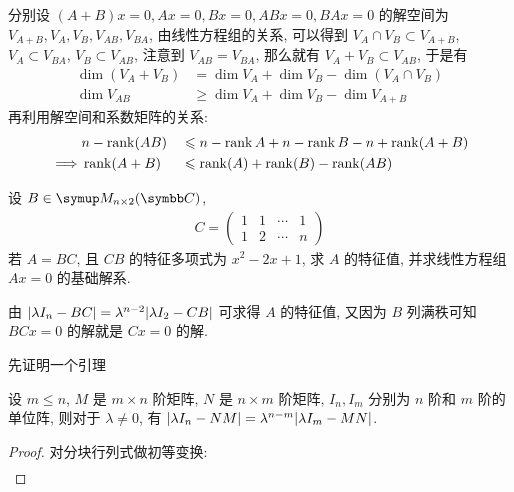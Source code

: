 \begin{exercise}[series=exer]
\begin{hint}
    \end{hint}
    \begin{answer}
        分别设 $ (A + B)x = 0, Ax = 0, Bx = 0, ABx = 0, BAx = 0 $ 的解空间为 $ V_{A+B}, V_{A}, V_{B}, V_{AB}, V_{BA} $, 由线性方程组的关系, 可以得到 $ V_{A} \cap V_{B} \subset V_{A + B} $, $ V_{A} \subset V_{BA}  $, $ V_{B} \subset V_{AB} $, 注意到 $ V_{AB} = V_{BA} $, 那么就有 $ V_{A} + V_{B} \subset V_{AB} $, 于是有
        \begin{align*}
            \dim(V_{A} + V_{B}) & = \dim V_{A} + \dim V_{B} - \dim(V_{A} \cap V_{B})\\
            \dim V_{AB} & \ge  \dim V_{A} + \dim V_{B} - \dim V_{A + B}
        \end{align*}
        再利用解空间和系数矩阵的关系:
        \begin{alignat*}{2}
            & n - \rank (AB) && \leqslant  n - \rank A + n - \rank B - n + \rank (A + B) \\
            \implies & \rank(A + B) && \leqslant \rank(A) + \rank(B) - \rank(AB)
        \end{alignat*}
    \end{answer}
    \item 设 $ B \in \MM[\C][n \times 2] $, 
    \begin{align*}
        C = \begin{pmatrix}
            1 & 1 & \cdots & 1\\
            1 & 2 & \cdots & n
        \end{pmatrix}
    \end{align*}
    若 $ A = BC $, 且 $ CB $ 的特征多项式为 $ x^{2} - 2x + 1 $, 求 $ A $ 的特征值, 并求线性方程组 $ Ax = 0 $ 的基础解系. 
    \begin{hint}
        由 $ \abs{\lambda I_{n} - BC} = \lambda^{n - 2}\abs{\lambda I_{2} - CB} $ 可求得 $ A $ 的特征值, 又因为 $ B $ 列满秩可知 $ BCx=0 $ 的解就是 $ Cx = 0 $ 的解.
    \end{hint}
    \begin{answer}
        先证明一个引理
        \begin{lemma}
            设 $ m \le n $, $ M $ 是 $ m \times n $ 阶矩阵, $ N $ 是 $ n \times m $ 阶矩阵, $ I_{n}, I_{m} $ 分别为 $ n $ 阶和 $ m $ 阶的单位阵, 则对于 $ \lambda \ne 0 $, 有 $ \abs{\lambda I_{n} - NM} = \lambda^{n - m}\abs{\lambda I_{m} - MN} $. 
        \end{lemma}
        \begin{proof}
            对分块行列式做初等变换:
            \begin{align*}

\end{align*}
\end{proof}
\end{answer}
\end{exercise}
